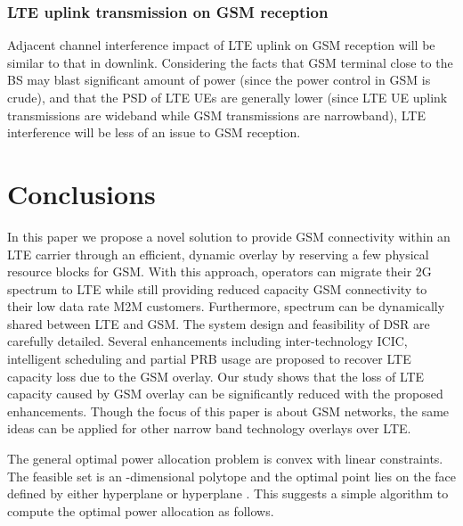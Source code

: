 \documentclass[10pt,journal]{IEEEtran}
\theoremstyle{slplain}
\begin{document}
\subsubsection{LTE uplink transmission on GSM reception}


Adjacent channel interference impact of LTE uplink on GSM reception will be similar to that in downlink. Considering the facts that GSM terminal close to the BS may blast significant amount of power (since the power control in GSM is crude), and that the PSD of LTE UEs are generally lower (since LTE UE uplink transmissions are wideband while GSM transmissions are narrowband), LTE interference will be less of an issue to GSM reception.








\section{Conclusions}
\label{sec:conclusion}

In this paper we propose a novel solution to provide GSM connectivity within an LTE carrier through an efficient, dynamic overlay by reserving a few physical resource blocks for GSM. With this approach, operators can migrate their 2G spectrum to LTE while still providing reduced capacity GSM connectivity to their low data rate M2M customers. Furthermore, spectrum can be dynamically shared between LTE and GSM. The system design and feasibility of DSR are carefully detailed. Several enhancements including inter-technology ICIC, intelligent scheduling and partial PRB usage are proposed to recover LTE capacity loss due to the GSM overlay. Our study shows that the loss of LTE capacity caused by GSM overlay can be significantly reduced with the proposed enhancements. Though the focus of this paper is about GSM networks, the same ideas can be applied for other narrow band technology overlays over LTE.








The general optimal power allocation problem is convex with linear constraints. The feasible set is an -dimensional polytope and the optimal point lies on the face defined by either hyperplane  or hyperplane .  This suggests a simple algorithm to compute the optimal power allocation as follows.
\end{document}

